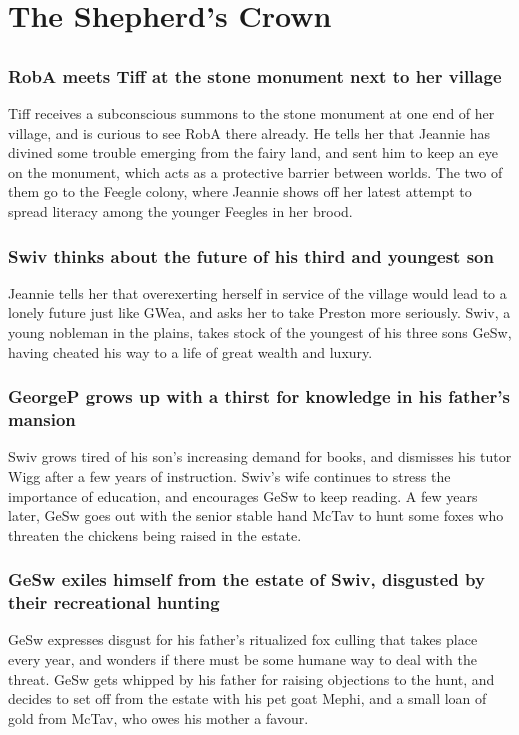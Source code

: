 \section{The Shepherd's Crown}


\subsection{}
\subsubsection{\Gls{RobA} meets \Gls{Tiff} at the stone monument next to her village}
\Gls{Tiff} receives a subconscious summons to the stone monument at one end of her village, and is
curious to see \Gls{RobA} there already. He tells her that \Gls{Jeannie} has divined some trouble
emerging from the fairy land, and sent him to keep an eye on the monument, which acts as a
protective barrier between worlds. The two of them go to the Feegle colony, where \Gls{Jeannie}
shows off her latest attempt to spread literacy among the younger Feegles in her brood.

\subsubsection{\Gls{Swiv} thinks about the future of his third and youngest son}
\Gls{Jeannie} tells her that overexerting herself in service of the village would lead to a lonely
future just like \Gls{GWea}, and asks her to take \Gls{Preston} more seriously. \Gls{Swiv}, a
young nobleman in the plains, takes stock of the youngest of his three sons \Gls{GeSw}, having
cheated his way to a life of great wealth and luxury.

\subsubsection{\Gls{GeorgeP} grows up with a thirst for knowledge in his father's mansion}
\Gls{Swiv} grows tired of his son's increasing demand for books, and dismisses his tutor \Gls{Wigg}
after a few years of instruction. \Gls{Swiv}'s wife continues to stress the importance of
education, and encourages \Gls{GeSw} to keep reading. A few years later, \Gls{GeSw} goes out with
the senior stable hand \Gls{McTav} to hunt some foxes who threaten the chickens being raised in
the estate.

\subsubsection{\Gls{GeSw} exiles himself from the estate of \Gls{Swiv}, disgusted by their
    recreational hunting}
\Gls{GeSw} expresses disgust for his father's ritualized fox culling that takes place every year,
and wonders if there must be some humane way to deal with the threat. \Gls{GeSw} gets whipped by
his father for raising objections to the hunt, and decides to set off from the estate with his
pet goat \Gls{Mephi}, and a small loan of gold from \Gls{McTav}, who owes his mother a favour.

